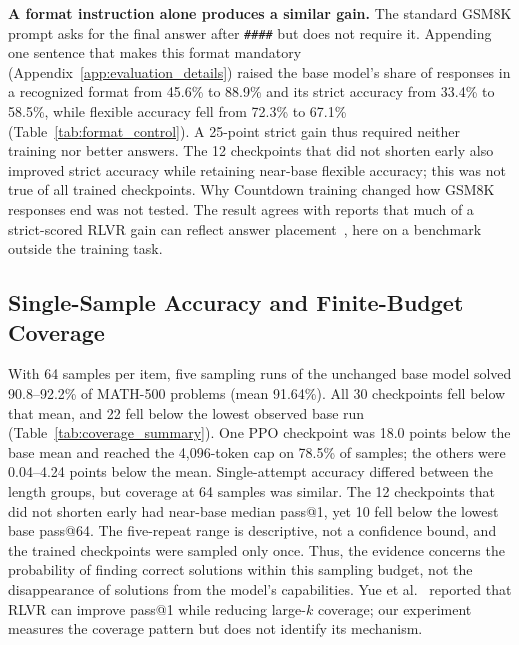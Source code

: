\documentclass[ai,article,submit,oneauthor]{Definitions/mdpi}
\begin{document}
\noindent\textbf{A format instruction alone produces a similar gain.}
The standard GSM8K prompt asks for the final answer after \texttt{\#\#\#\#} but does not require it. Appending one sentence that makes this format mandatory (Appendix~\ref{app:evaluation_details}) raised the base model's share of responses in a recognized format from 45.6\% to 88.9\% and its strict accuracy from 33.4\% to 58.5\%, while flexible accuracy fell from 72.3\% to 67.1\% (Table~\ref{tab:format_control}). A 25-point strict gain thus required neither training nor better answers. The 12 checkpoints that did not shorten early also improved strict accuracy while retaining near-base flexible accuracy; this was not true of all trained checkpoints. Why Countdown training changed how GSM8K responses end was not tested. The result agrees with reports that much of a strict-scored RLVR gain can reflect answer placement~\cite{lyu2026samebox,gupta2026formatcompliance}, here on a benchmark outside the training task.

\begin{table}[H]
\centering
\caption{GSM8K prompt-only format control on the unchanged base model. Both conditions were evaluated on one two-RTX-4090 workstation.}
\label{tab:format_control}
\end{table}

\subsection{Single-Sample Accuracy and Finite-Budget Coverage}\label{sec:coverage}

With 64 samples per item, five sampling runs of the unchanged base model solved 90.8--92.2\% of MATH-500 problems (mean 91.64\%). All 30 checkpoints fell below that mean, and 22 fell below the lowest observed base run (Table~\ref{tab:coverage_summary}). One PPO checkpoint was 18.0 points below the base mean and reached the 4,096-token cap on 78.5\% of samples; the others were 0.04--4.24 points below the mean. Single-attempt accuracy differed between the length groups, but coverage at 64 samples was similar. The 12 checkpoints that did not shorten early had near-base median pass@1, yet 10 fell below the lowest base pass@64. The five-repeat range is descriptive, not a confidence bound, and the trained checkpoints were sampled only once. Thus, the evidence concerns the probability of finding correct solutions within this sampling budget, not the disappearance of solutions from the model's capabilities. Yue et al.~\cite{yue2025reasoningcapacity} reported that RLVR can improve pass@1 while reducing large-$k$ coverage; our experiment measures the coverage pattern but does not identify its mechanism.
\end{document}
